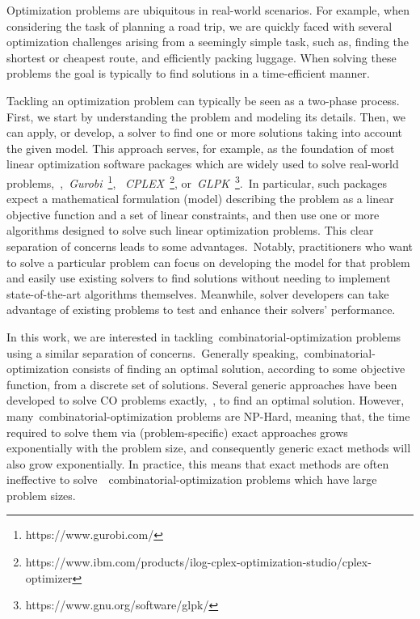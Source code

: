 Optimization problems are ubiquitous in real-world scenarios. For example, when
considering the task of planning a road trip, we are quickly faced with several
optimization challenges arising from a seemingly simple task, such as, finding
the shortest or cheapest route, and efficiently packing luggage. When solving
these problems the goal is typically to find  solutions in a
time-efficient manner.

Tackling an optimization problem can typically be seen as a two-phase process.
First, we start by understanding the problem and modeling its details. Then, we
can apply, or develop, a solver to find one or more solutions taking into
account the given model. This approach serves, for example, as the foundation of
most linear optimization software packages which are widely used to solve
real-world problems,~\eg{},~\textit{Gurobi}~\footnote{https://www.gurobi.com/},
~\textit{CPLEX}~\footnote{https://www.ibm.com/products/ilog-cplex-optimization-studio/cplex-optimizer},
or~\textit{GLPK}~\footnote{https://www.gnu.org/software/glpk/}.~In particular,
such packages expect a mathematical formulation (model) describing the problem
as a linear objective function and a set of linear constraints, and then use one
or more algorithms designed to solve such linear optimization problems. This
clear separation of concerns leads to some advantages.~Notably, practitioners
who want to solve a particular problem can focus on developing the model for
that problem and easily use existing solvers to find solutions without needing
to implement state-of-the-art algorithms themselves. Meanwhile, solver
developers can take advantage of existing problems to test and enhance their
solvers' performance.

In this work, we are interested in tackling~\acrfull{combinatorial-optimization}
problems using a similar separation of concerns.~Generally
speaking,~\acrshort{combinatorial-optimization} consists of finding an optimal
solution, according to some objective function, from a discrete set of
solutions. Several generic approaches have been developed to solve CO problems
exactly,~\ie{}, to find an optimal solution. However,
many~\acrshort{combinatorial-optimization} problems are NP-Hard, meaning that,
the time required to solve them via (problem-specific) exact approaches grows
exponentially with the problem size, and consequently generic exact methods will
also grow exponentially. In practice, this means that exact methods are often
ineffective to solve~~\acrshort{combinatorial-optimization} problems
which have large problem sizes.

